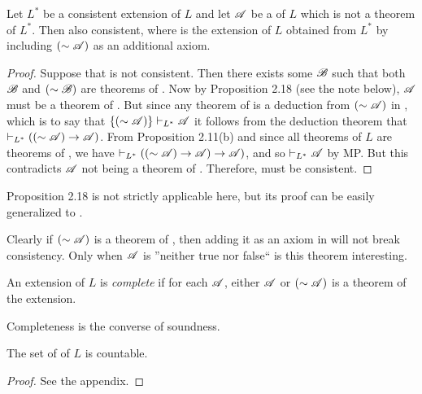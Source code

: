\begin{proposition}
  Let \(L^{\ast}\) be a consistent extension of \(L\) and let \(\mathscr{A}\) be a \wf{} of \(L\) which is not a theorem of \(L^{\ast}\). Then \Lextext{} also consistent, where \Lextext{} is the extension of \(L\) obtained from \(L^{\ast}\) by including \((\sim\mathscr{A})\) as an additional axiom.

  \begin{proof}
    Suppose that \Lextext{} is not consistent. Then there exists some \wf{} \(\mathscr{B}\) such that both \(\mathscr{B}\) and \((\sim\mathscr{B})\) are theorems of \Lextext{}. Now by Proposition 2.18 (see the note below), \(\mathscr{A}\) must be a theorem of \Lextext{}. But since any theorem of \Lextext{} is a deduction from \((\sim\mathscr{A})\) in \Lext{}, which is to say that \(\{(\sim\mathscr{A})\} \vdash_{L^{\ast}} \mathscr{A}\) it follows from the deduction theorem that \(\vdash_{L^{\ast}} ((\sim\mathscr{A}) \rightarrow \mathscr{A})\). From Proposition 2.11(b) and since all theorems of \(L\) are theorems of \Lext{}, we have \(\vdash_{L^{\ast}} ((\sim\mathscr{A}) \rightarrow \mathscr{A}) \rightarrow \mathscr{A})\), and so \(\vdash_{L^{\ast}} \mathscr{A}\) by MP. But this contradicts \(\mathscr{A}\) not being a theorem of \Lext{}. Therefore, \Lextext{} must be consistent.
  \end{proof}

  \note{} Proposition 2.18 is not strictly applicable here, but its proof can be easily generalized to \Lextext{}.

  \note{} Clearly if \((\sim\mathscr{A})\) is a theorem of \Lext{}, then adding it as an axiom in \Lextext{} will not break consistency. Only when \(\mathscr{A}\) is ''neither true nor false`` is this theorem interesting.
\end{proposition}

\begin{definition}
  An extension of \(L\) is \textit{complete} if for each \wf{} \(\mathscr{A}\), either \(\mathscr{A}\) or \((\sim\mathscr{A})\) is a theorem of the extension.
  
  \note{} Completeness is the converse of soundness.
\end{definition}

\begin{proposition*}
  The set of \wfs{} of \(L\) is countable.  

  \begin{proof}
    See the appendix.
  \end{proof}
\end{proposition*}

